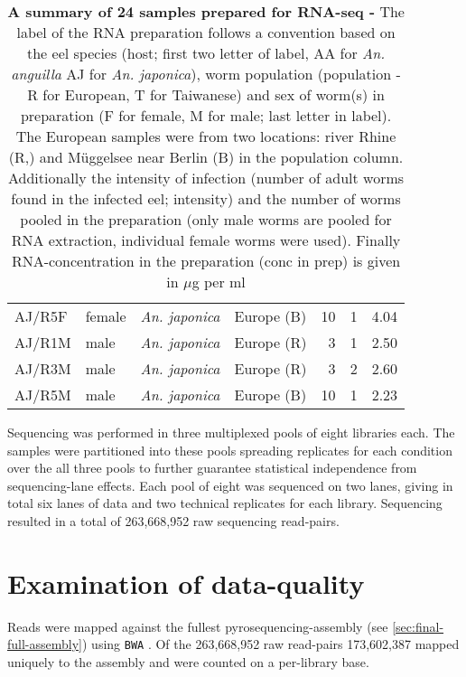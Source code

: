 \begin{table}[h]
\begin{center}
\begin{tabular}{llllrrr}
  AJ/R5F & female & \textit{An. japonica} & Europe (B) & 10 & 1 & 4.04 \\ 
  AJ/R1M & male & \textit{An. japonica} & Europe (R) & 3 & 1 & 2.50 \\ 
  AJ/R3M & male & \textit{An. japonica} & Europe (R) & 3 & 2 & 2.60 \\ 
  AJ/R5M & male & \textit{An. japonica} & Europe (B) & 10 & 1 & 2.23 \\ 
   \hline
\end{tabular}
\caption[Summary of RNA preparation]{\textbf{A summary of 24 samples
    prepared for RNA-seq -} The label of the RNA preparation follows a
  convention based on the eel species (host; first two letter of
  label, AA for \textit{An. anguilla} AJ for \textit{An. japonica}),
  worm population (population - R for European, T for Taiwanese) and
  sex of worm(s) in preparation (F for female, M for male; last letter
  in label). The European samples were from two locations: river Rhine
  (R,) and M\"uggelsee near Berlin (B) in the population
  column. Additionally the intensity of infection (number of adult
  worms found in the infected eel; intensity) and the number of worms
  pooled in the preparation (only male worms are pooled for RNA
  extraction, individual female worms were used). Finally
  RNA-concentration in the preparation (conc in prep) is given in
  $\mu$g per ml}
\label{tab:lib-prep}
\end{center}
\end{table}


Sequencing was performed in three multiplexed pools of eight libraries
each. The samples were partitioned into these pools spreading
replicates for each condition over the all three pools to further
guarantee statistical independence from sequencing-lane effects. Each
pool of eight was sequenced on two lanes, giving in total six lanes of
data and two technical replicates for each library. Sequencing
resulted in a total of 263,668,952 raw sequencing read-pairs.

\section{Examination of data-quality}

Reads were mapped against the fullest pyrosequencing-assembly (see
\ref{sec:final-full-assembly}) using \texttt{BWA}
\cite{pmid20080505}. Of the 263,668,952 raw read-pairs 173,602,387
mapped uniquely to the assembly and were counted on a per-library
base. 

